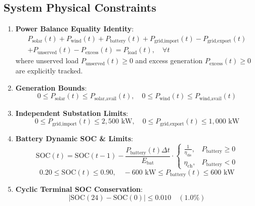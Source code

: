 \documentclass[journal,10pt,twocolumn]{IEEEtran}
\begin{document}
\subsection{System Physical Constraints}
\begin{enumerate}
    \item \textbf{Power Balance Equality Identity}:
    \begin{multline}
    P_{\text{solar}}(t) + P_{\text{wind}}(t) + P_{\text{battery}}(t) + P_{\text{grid,import}}(t) - P_{\text{grid,export}}(t) \\
    + P_{\text{unserved}}(t) - P_{\text{excess}}(t) = P_{\text{load}}(t), \quad \forall t
    \end{multline}
    where unserved load $P_{\text{unserved}}(t) \ge 0$ and excess generation $P_{\text{excess}}(t) \ge 0$ are explicitly tracked.
    \item \textbf{Generation Bounds}:
    \begin{equation}
    0 \le P_{\text{solar}}(t) \le P_{\text{solar,avail}}(t), \quad 0 \le P_{\text{wind}}(t) \le P_{\text{wind,avail}}(t)
    \end{equation}
    \item \textbf{Independent Substation Limits}:
    \begin{equation}
    0 \le P_{\text{grid,import}}(t) \le 2,500\text{ kW}, \quad 0 \le P_{\text{grid,export}}(t) \le 1,000\text{ kW}
    \end{equation}
    \item \textbf{Battery Dynamic SOC \& Limits}:
    \begin{equation}
    \text{SOC}(t) = \text{SOC}(t-1) - \frac{P_{\text{battery}}(t) \Delta t}{E_{\text{bat}}} \cdot \begin{cases} \frac{1}{\eta_{\text{dis}}}, & P_{\text{battery}} \ge 0 \\ \eta_{\text{ch}}, & P_{\text{battery}} < 0 \end{cases}
    \end{equation}
    \begin{equation}
    0.20 \le \text{SOC}(t) \le 0.90, \quad -600\text{ kW} \le P_{\text{battery}}(t) \le 600\text{ kW}
    \end{equation}
    \item \textbf{Cyclic Terminal SOC Conservation}:
    \begin{equation}
    |\text{SOC}(24) - \text{SOC}(0)| \le 0.010 \quad (1.0\%)
    \end{equation}
\end{enumerate}
\end{document}

